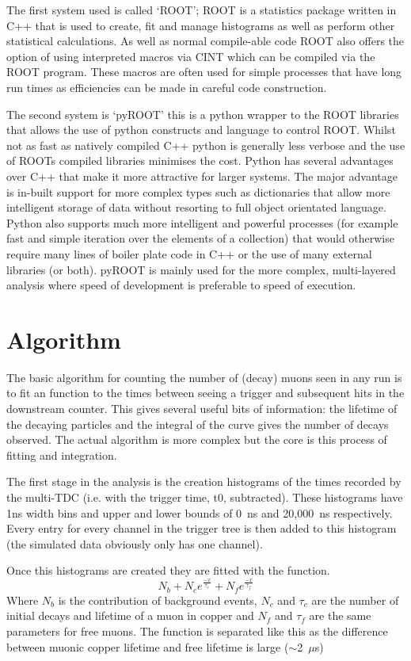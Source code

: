 \documentclass[]{article}
\newcommand{\ms}{$\mu$s}
\begin{document}
The first system used is called `ROOT'; ROOT is a statistics package written in C++ that is used to create, fit and manage histograms as well as perform other statistical calculations. As well as normal compile-able code ROOT also offers the option of using interpreted macros via CINT which can be compiled via the ROOT program. These macros are often used for simple processes that have long run times as efficiencies can be made in careful code construction.

The second system is `pyROOT' this is a python wrapper to the ROOT libraries that allows the use of python constructs and language to control ROOT. Whilst not as fast as natively compiled C++ python is generally less verbose and the use of ROOTs compiled libraries minimises the cost. Python has several advantages over C++ that make it more attractive for larger systems. The major advantage is in-built support for more complex types such as dictionaries that allow more intelligent storage of data without resorting to full object orientated language. Python also supports much more intelligent and powerful processes (for example fast and simple iteration over the elements of a collection) that would otherwise require many lines of boiler plate code in C++ or the use of many external libraries (or both). pyROOT is mainly used for the more complex, multi-layered analysis where speed of development is preferable to speed of execution.

\section{Algorithm}\label{sec:algorithm}
The basic algorithm for counting the number of (decay) muons seen in any run is to fit an function to the times between seeing a trigger and subsequent hits in the downstream counter. This gives several useful bits of information: the lifetime of the decaying particles and the integral of the curve gives the number of decays observed. The actual algorithm is more complex but the core is this process of fitting and integration. 

The first stage in the analysis is the creation histograms of the times recorded by the multi-TDC (i.e. with the trigger time, t0, subtracted). These histograms have 1ns width bins and upper and lower bounds of 0~ns and 20,000~ns respectively. Every entry for every channel in the trigger tree is then added to this histogram (the simulated data obviously only has one channel). 

Once this histograms are created they are fitted with the function. 
\begin{equation}\label{equ:fit}
	N_{b} + N_{c}e^{\frac{-x}{\tau_{c}}} + N_{f}e^{\frac{-x}{\tau_{f}}}
\end{equation}
Where $N_{b}$ is the contribution of background events, $N_{c}$ and $\tau_{c}$ are the number of initial decays and lifetime of a muon in copper and $N_{f}$ and $\tau_{f}$ are the same parameters for free muons. The function is separated like this as the difference between muonic copper lifetime and free lifetime is large ($\sim$2~\ms)
\end{document}
